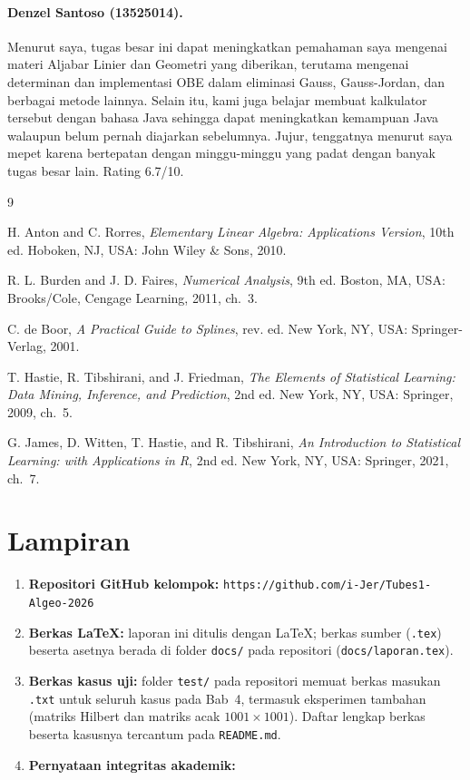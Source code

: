 \documentclass[12pt,a4paper]{article}
\newcommand{\repourl}{https://github.com/i-Jer/Tubes1-Algeo-2026}
\begin{document}
\paragraph{Denzel Santoso (13525014).}
Menurut saya, tugas besar ini dapat meningkatkan pemahaman saya mengenai materi Aljabar Linier dan Geometri yang diberikan, terutama mengenai determinan dan implementasi OBE dalam eliminasi Gauss, Gauss-Jordan, dan berbagai metode lainnya. Selain itu, kami juga belajar membuat kalkulator tersebut dengan bahasa Java sehingga dapat meningkatkan kemampuan Java walaupun belum pernah diajarkan sebelumnya. Jujur, tenggatnya menurut saya mepet karena bertepatan dengan minggu-minggu yang padat dengan banyak tugas besar lain. Rating 6.7/10.


\begin{thebibliography}{9}

H. Anton and C. Rorres, \textit{Elementary Linear Algebra: Applications Version}, 10th ed. Hoboken, NJ, USA: John Wiley \& Sons, 2010.

R. L. Burden and J. D. Faires, \textit{Numerical Analysis}, 9th ed. Boston, MA, USA: Brooks/Cole, Cengage Learning, 2011, ch.~3.

C. de Boor, \textit{A Practical Guide to Splines}, rev. ed. New York, NY, USA: Springer-Verlag, 2001.

T. Hastie, R. Tibshirani, and J. Friedman, \textit{The Elements of Statistical Learning: Data Mining, Inference, and Prediction}, 2nd ed. New York, NY, USA: Springer, 2009, ch.~5.

G. James, D. Witten, T. Hastie, and R. Tibshirani, \textit{An Introduction to Statistical Learning: with Applications in R}, 2nd ed. New York, NY, USA: Springer, 2021, ch.~7.

\end{thebibliography}

\section*{Lampiran}

\begin{enumerate}[label=\arabic*.]
  \item \textbf{Repositori GitHub kelompok:} \texttt{\repourl}
  \item \textbf{Berkas \LaTeX:} laporan ini ditulis dengan \LaTeX; berkas sumber (\texttt{.tex}) beserta asetnya berada di folder \texttt{docs/} pada repositori (\texttt{docs/laporan.tex}).
  \item \textbf{Berkas kasus uji:} folder \texttt{test/} pada repositori memuat berkas masukan \texttt{.txt} untuk seluruh kasus pada Bab~4, termasuk eksperimen tambahan (matriks Hilbert dan matriks acak $1001\times1001$). Daftar lengkap berkas beserta kasusnya tercantum pada \texttt{README.md}.
  \item \textbf{Pernyataan integritas akademik:}
\end{enumerate}
\end{document}

